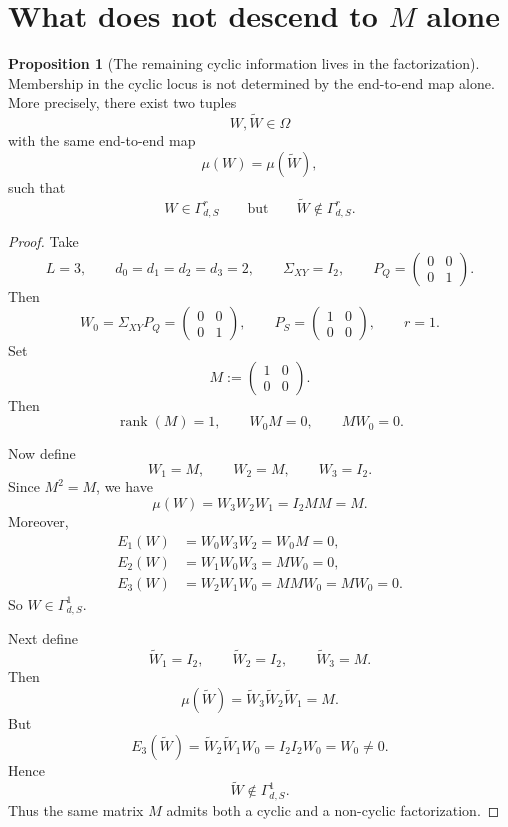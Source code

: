 \documentclass{article}
\newcommand{\rk}{\operatorname{rank}}
\theoremstyle{definition}
\newtheorem{proposition}[theorem]{Proposition}
\begin{document}
\section{What does not descend to $M$ alone}

\begin{proposition}[The remaining cyclic information lives in the factorization]\label{prop:factorized-information}
Membership in the cyclic locus is not determined by the end-to-end map alone. More precisely, there exist two tuples
\[
W,\widetilde W\in \Omega
\]
with the same end-to-end map
\[
\mu(W)=\mu(\widetilde W),
\]
such that
\[
W\in \Gamma_{d,S}^r
\qquad\text{but}\qquad
\widetilde W\notin \Gamma_{d,S}^r.
\]
\end{proposition}

\begin{proof}
Take
\[
L=3,
\qquad
d_0=d_1=d_2=d_3=2,
\qquad
\Sigma_{XY}=I_2,
\qquad
P_Q=
\begin{pmatrix}
0&0\\
0&1
\end{pmatrix}.
\]
Then
\[
W_0=\Sigma_{XY}P_Q=
\begin{pmatrix}
0&0\\
0&1
\end{pmatrix},
\qquad
P_S=
\begin{pmatrix}
1&0\\
0&0
\end{pmatrix},
\qquad
r=1.
\]
Set
\[
M:=
\begin{pmatrix}
1&0\\
0&0
\end{pmatrix}.
\]
Then
\[
\rk(M)=1,
\qquad
W_0M=0,
\qquad
MW_0=0.
\]

Now define
\[
W_1=M,\qquad W_2=M,\qquad W_3=I_2.
\]
Since $M^2=M$, we have
\[
\mu(W)=W_3W_2W_1=I_2MM=M.
\]
Moreover,
\begin{align*}
E_1(W)&=W_0W_3W_2=W_0M=0, \\
E_2(W)&=W_1W_0W_3=MW_0=0, \\
E_3(W)&=W_2W_1W_0=MMW_0=MW_0=0.
\end{align*}
So $W\in \Gamma_{d,S}^1$.

Next define
\[
\widetilde W_1=I_2,\qquad \widetilde W_2=I_2,\qquad \widetilde W_3=M.
\]
Then
\[
\mu(\widetilde W)=\widetilde W_3\widetilde W_2\widetilde W_1=M.
\]
But
\[
E_3(\widetilde W)=\widetilde W_2\widetilde W_1W_0=I_2I_2W_0=W_0\neq 0.
\]
Hence
\[
\widetilde W\notin \Gamma_{d,S}^1.
\]
Thus the same matrix $M$ admits both a cyclic and a non-cyclic factorization.
\end{proof}
\end{document}
